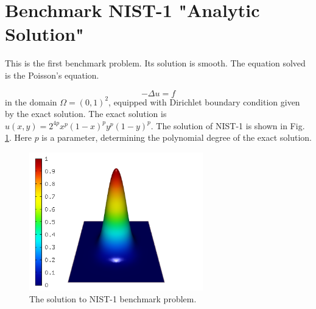 \documentclass[12pt]{elsarticle}
\begin{document}

\section{Benchmark NIST-1 "Analytic Solution"}
\label{sec:bench-1}

This is the first benchmark problem. Its solution is smooth.
The equation solved is the Poisson's equation.

\begin{equation} \label{poisson}
-\Delta u = f
\end{equation}
in the domain $\Omega = (0, 1)^2$, equipped with Dirichlet
boundary condition given by the exact solution.
The exact solution is $u(x, y) = 2^{4p}x^{p}(1-x)^{p}y^{p}(1-y)^{p}$.
The solution of NIST-1 is shown in Fig. \ref{fig:sln-nist01}.
Here $p$ is a parameter, determining the polynomial degree of the exact solution.

\begin{figure}[H]
\centering
\vspace{-3mm}
\includegraphics[height=6cm]{nist/nist-1/solution.png}
\vspace{-3mm}
\caption{The solution to NIST-1 benchmark problem.}
\label{fig:sln-nist01}
\end{figure}
\end{document}
